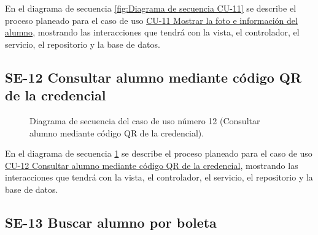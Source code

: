 En el diagrama de secuencia \ref{fig:Diagrama de secuencia CU-11} se describe el proceso planeado para el caso de uso \hyperlink{CU-11}{CU-11 Mostrar la foto e información  del alumno}, mostrando las interacciones que tendrá con la vista, el controlador, el servicio, el repositorio y la base de datos.

\newpage

\subsection{SE-12 Consultar alumno mediante código QR de la credencial}

\begin{figure}[htbp!]
	\begin{center}
		\caption{Diagrama de secuencia del caso de uso número 12 (Consultar alumno mediante código QR de la credencial).}
		\label{fig:Diagrama de secuencia CU-12}
	\end{center}
\end{figure}

En el diagrama de secuencia \ref{fig:Diagrama de secuencia CU-12} se describe el proceso planeado para el caso de uso \hyperlink{CU-12}{CU-12 Consultar alumno mediante código QR de la credencial}, mostrando las interacciones que tendrá con la vista, el controlador, el servicio, el repositorio y la base de datos.

\newpage

\subsection{SE-13 Buscar alumno por boleta}


